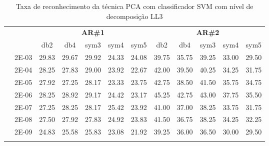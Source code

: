 \begin{table}[H]
\begin{tabular}{|c|c|c c c c c|c c c c c|}
	
\\\midrule
\end{tabular}

\end{table}



\begin{table}[H]
	\centering
    \normalsize
	\caption{Taxa de reconhecimento da técnica  PCA com classificador SVM com nível de decomposição LL3}
	\begin{tabular}{|c|c|c c c c c|c c c c c|}
\cline{3-12}
\multicolumn{2}{c|}{\multirow{2}{*}{}} & \multicolumn{5}{c|}{\textbf{AR\#1}}  & \multicolumn{5}{c|}{\textbf{AR\#2}} \\\cline{3-12}

\multicolumn{2}{c|}{}  & db2 & db4 & sym3 & sym4 & sym5 & db2 & db4& sym3 & sym4 & sym5 \\\hline
\multicolumn{1}{|c|}{ \multirow{6}{*}{\rotatebox[origin=c]{90}{\textbf{Gamma}}} }
&2E-03&	29.83&	29.67&	29.92&	24.33&	24.08&	39.75	&35.75&	39.25&	33.00&	29.50	\\\cline{2-12}
&2E-04&	28.25&	27.83&	29.00&	23.92&	22.67&	42.00	&39.50&	40.25&	34.25&	31.75	\\\cline{2-12}
&2E-05&	27.92&	27.25&	28.17&	23.33&	23.75&	42.75	&38.50&	41.50&	35.75&	34.75	\\\cline{2-12}
&2E-06&	28.25&	28.92&	29.17&	24.42&	23.17&	45.25	&42.75&	43.00&	37.75&	35.50	\\\cline{2-12}
&2E-07&	27.25&	28.25&	28.17&	25.42&	23.92&	41.00	&37.00&	38.25&	33.75&	31.75	\\\cline{2-12}
&2E-08&	27.50&	27.92&	27.83&	24.92&	23.83&	41.50	&36.75&	38.25&	34.25&	32.25	\\\cline{2-12}
&2E-09&	24.83&	25.58&	25.83&	23.08&	21.92&	39.25	&36.00&	36.50&	30.00&	29.50	



\\ \midrule
\multicolumn{12}{c}{}\\ 


\end{tabular}
\end{table}
